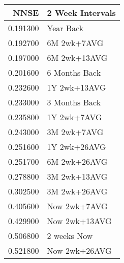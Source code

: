 \begin{tabular}{rl}
NNSE & 2 Week Intervals \\
\hline
0.191300 & Year Back \\
0.192700 & 6M 2wk+7AVG \\
0.197000 & 6M 2wk+13AVG \\
0.201600 & 6 Months Back \\
0.232600 & 1Y 2wk+13AVG \\
0.233000 & 3 Months Back \\
0.235800 & 1Y 2wk+7AVG \\
0.243000 & 3M 2wk+7AVG \\
0.251600 & 1Y 2wk+26AVG \\
0.251700 & 6M 2wk+26AVG \\
0.278800 & 3M 2wk+13AVG \\
0.302500 & 3M 2wk+26AVG \\
0.405600 & Now 2wk+7AVG \\
0.429900 & Now 2wk+13AVG \\
0.506800 & 2 weeks Now \\
0.521800 & Now 2wk+26AVG \\
\hline
\end{tabular}
